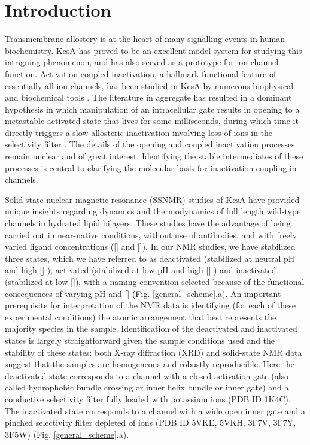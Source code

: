 \documentclass[%
 aip,
 amsmath,amssymb,
 preprint,%
]{revtex4-1}
\begin{document}
\section{Introduction}
Transmembrane allostery is at the heart of many signalling events in human biochemistry.\cite{Cournia2020} KcsA has proved to be an excellent model system for studying this intriguing phenomenon, and has also served as a prototype for ion channel function.\cite{Xu2017} Activation coupled inactivation, a hallmark functional feature of essentially all ion channels, has been studied in KcsA by numerous biophysical and biochemical tools \cite{Li2018,Cuello2017,Xu2019,Furini2020,Ostmeyer2013,Sun2020,Ader2009,Labro2018,Delemotte2018}. The literature in aggregate has resulted in a dominant hypothesis in which manipulation of an intracellular gate results in opening to a metastable activated state that lives for some milliseconds, during which time it directly triggers a slow allosteric inactivation involving loss of ions in the selectivity filter \cite{Li2018,Xu2019,Zhang2020a}. The details of the opening and coupled inactivation processes remain unclear and of great interest. Identifying the stable intermediates of these processes is central to clarifying the molecular basis for inactivation coupling in channels. 

Solid-state nuclear magnetic resonance (SSNMR) studies of KcsA have provided unique insights regarding dynamics and thermodynamics of full length wild-type channels in hydrated lipid bilayers. These studies have the advantage of being carried out in near-native conditions, without use of antibodies, and with freely varied ligand concentrations ([] and []). In our NMR studies, we have stabilized three states, which we have referred to as deactivated (stabilized at neutral pH and high [] ), activated (stabilized at low pH and high [] ) and inactivated (stabilized at low []), with a naming convention selected because of the functional consequences of varying pH and [] (Fig. \ref{general_scheme}.a). An important prerequisite for interpretation of the NMR data is identifying (for each of these experimental conditions) the atomic arrangement that best represents the majority species in the sample. Identification of the deactivated and inactivated states is largely straightforward given the sample conditions used and the stability of these states: both X-ray diffraction (XRD) and solid-state NMR data suggest that the samples are homogeneous and robustly reproducible. Here the deactivated state corresponds to a channel with a closed activation gate (also called hydrophobic bundle crossing or inner helix bundle or inner gate) and a conductive selectivity filter fully loaded with potassium ions (PDB ID 1K4C)\cite{Zhou2001,Bhate2013,Wylie2014,Medeiros-Silva2016,Jekhmane2019}. The inactivated state corresponds to a channel with a wide open inner gate and a pinched selectivity filter depleted of ions (PDB ID 5VKE, 5VKH, 3F7V, 3F7Y, 3F5W)\cite{Cuello2010,Ader2009,Bhate2010,Cuello2017} (Fig. \ref{general_scheme}.a). 
\end{document}
